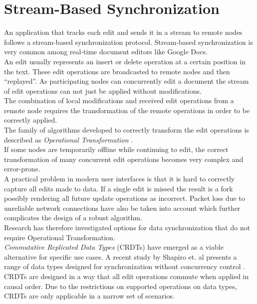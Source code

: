 \section{Stream-Based Synchronization}
An application that tracks each edit and sends it in a stream to remote nodes follows a stream-based synchronization protocol.
Stream-based synchronization is very common among real-time document editors like Google Docs.\\

An edit usually represents an insert or delete operation at a certain position in the text.
These edit operations are broadcasted to remote nodes and then ``replayed''.
As participating nodes can concurrently edit a document the stream of edit operations can not just be applied without modifications.\\
The combination of local modifications and received edit operations from a remote node requires the transformation of the remote operations in order to be correctly applied.\\
The family of algorithms developed to correctly transform the edit operations is described as \emph{Operational Transformation} \cite{Ellis:1998vf}.\\
If some nodes are temporarily offline while continuing to edit, the correct transformation of many concurrent edit operations becomes very complex and error-prone.\\
A practical problem in modern user interfaces is that it is hard to correctly capture all edits made to data.
If a single edit is missed the result is a fork possibly rendering all future update operations as incorrect.
Packet loss due to unreliable network connections have also be taken into account which further complicates the design of a robust algorithm.\\
Research has therefore investigated options for data synchronization that do not require Operational Transformation.\\

\emph{Commutative Replicated Data Types} (CRDTs) have emerged as a viable alternative for specific use cases.
A recent study by Shapiro et. al presents a range of data types designed for synchronization without concurrency control \cite{Shapiro:2011wy}.\\
CRDTs are designed in a way that all edit operations commute when applied in causal order.
Due to the restrictions on supported operations on data types, CRDTs are only applicable in a narrow set of scenarios.

